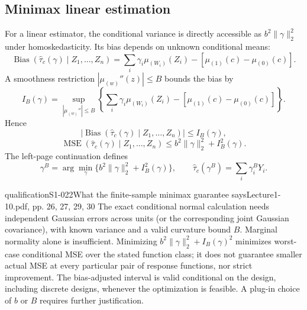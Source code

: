 \subsection{Minimax linear estimation}
 For a linear estimator, the conditional variance is directly accessible as $b^2\|\gamma\|_2^2$ under homoskedasticity. Its bias depends on unknown conditional means:
\[
\operatorname{Bias}(\widehat\tau_c(\gamma)\mid Z_1,\ldots,Z_n)
=\sum_i\gamma_i\mu_{(W_i)}(Z_i)-[\mu_{(1)}(c)-\mu_{(0)}(c)].
\]
A smoothness restriction $|\mu_{(w)}''(z)|\leq B$ bounds the bias by
\[
I_B(\gamma)=\sup_{|\mu_{(w)}''|\leq B}
\left\{\sum_i\gamma_i\mu_{(W_i)}(Z_i)-[\mu_{(1)}(c)-\mu_{(0)}(c)]\right\}.
\]
 Hence
\[
|\operatorname{Bias}(\widehat\tau_c(\gamma)\mid Z_1,\ldots,Z_n)|\leq I_B(\gamma),
\]
\[
\operatorname{MSE}(\widehat\tau_c(\gamma)\mid Z_1,\ldots,Z_n)
\leq b^2\|\gamma\|_2^2+I_B^2(\gamma).
\]
 The left-page continuation defines
\[
\gamma^B=\arg\min_\gamma\{b^2\|\gamma\|_2^2+I_B^2(\gamma)\},\qquad
\widehat\tau_c(\gamma^B)=\sum_i\gamma_i^B Y_i.
\tag{6.8 in the notes}
\]
\begin{reviewnote}{qualification}{S1-022}{What the finite-sample minimax guarantee says}{Lecture1-10.pdf, pp. 26, 27, 29, 30}
The exact conditional normal calculation needs independent Gaussian errors across units (or the corresponding joint Gaussian covariance), with known variance and a valid curvature bound $B$. Marginal normality alone is insufficient. Minimizing $b^2\|\gamma\|_2^2+I_B(\gamma)^2$ minimizes worst-case conditional MSE over the stated function class; it does not guarantee smaller actual MSE at every particular pair of response functions, nor strict improvement. The bias-adjusted interval is valid conditional on the design, including discrete designs, whenever the optimization is feasible. A plug-in choice of $b$ or $B$ requires further justification.
\end{reviewnote}

